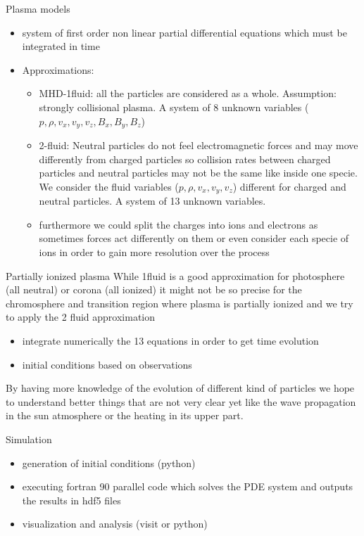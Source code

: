 \documentclass{beamer}
\begin{document}
\begin{frame}{Plasma models}
\begin{itemize}
\item system of first order non linear partial differential equations which must be integrated in time
\item Approximations:
\begin{itemize}
\item MHD-1fluid: all the particles are considered as a whole. Assumption: strongly collisional plasma. A system of 8 unknown variables
($p,\rho,v_x,v_y,v_z,B_x,B_y,B_z$)
\item 2-fluid: Neutral particles do not feel electromagnetic forces and may move  differently from charged particles so collision rates between 
charged particles and neutral particles may not be the same like inside one specie. 
We consider the fluid variables ($p,\rho,v_x,v_y,v_z$) different for charged and neutral particles. A system of 13 unknown variables.
\item furthermore we could split the charges into ions and electrons as sometimes forces act differently on them or even consider each specie of ions
in order to gain more resolution over the process
\end{itemize}
\end{itemize}
\end{frame}
\begin{frame}{Partially ionized plasma}
While 1fluid is a good approximation for photosphere (all neutral) or corona (all ionized) it might not be so precise 
for the chromosphere and transition region where plasma is partially ionized and we try to apply the 2 fluid approximation
\begin{itemize}
\item integrate numerically the 13 equations in order to get time evolution
\item initial conditions based on observations 
\end{itemize}
By having more knowledge of the evolution of different kind of particles we hope to understand better things that are not very clear yet like
the wave propagation in the sun atmosphere or the heating in its  upper  part.

\end{frame}
\begin{frame}{Simulation}
\begin{itemize}
\item generation of initial conditions (python)
\item executing fortran 90  parallel code which solves the PDE system and outputs the results in hdf5 files
\item visualization  and analysis (visit or python)
\end{itemize}
\end{frame}
\end{document}

